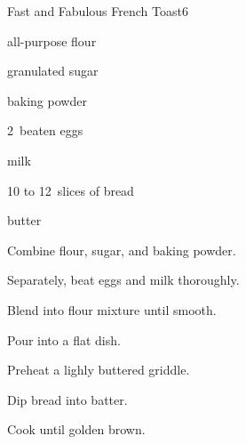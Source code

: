 \begin{recipe}{Fast and Fabulous French Toast}{}{6}

\begin{ingredients}
\item {} all-purpose flour
\item {} granulated sugar
\item {} baking powder
\item 2~beaten eggs
\item \C{1\half} milk
\item 10 to 12~slices of bread
\item butter
\end{ingredients}

\begin{directions}
\item Combine flour, sugar, and baking powder.
\item Separately, beat eggs and milk thoroughly.
\item Blend into flour mixture until smooth.
\item Pour into a flat dish.
\item Preheat a lighly buttered griddle.
\item Dip bread into batter.
\item Cook until golden brown.
\end{directions}

\end{recipe}
